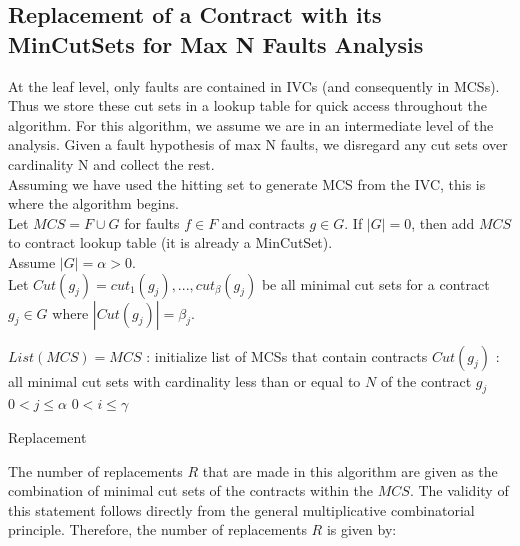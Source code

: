 \subsection{Replacement of a Contract with its MinCutSets for Max N Faults Analysis}

At the leaf level, only faults are contained in IVCs (and consequently in MCSs). Thus we store these cut sets in a lookup table for quick access throughout the algorithm. For this algorithm, we assume we are in an intermediate level of the analysis. Given a fault hypothesis of max N faults, we disregard any cut sets over cardinality N and collect the rest.\\

Assuming we have used the hitting set to generate MCS from the IVC, this is where the algorithm begins. \\

Let $MCS = F \cup G$ for faults $f \in F$ and contracts $g \in G$. If $|G| = 0$, then add $MCS$ to contract lookup table (it is already a MinCutSet). \\

Assume $|G| = \alpha > 0$.\\

Let $Cut(g_j) = {cut_1(g_j), ..., cut_{\beta}(g_j)}$ be all minimal cut sets for a contract $g_j \in G$ where $|Cut(g_j)|=\beta_j$.\\

\begin{algorithm}[H]
	$List(MCS) = {MCS}$ : initialize list of MCSs that contain contracts \;
	$Cut(g_j)$ : all minimal cut sets with cardinality less than or equal to $N$ of the contract $g_j$ \;
	$0 < j \leq \alpha$ \;
	$0 < i \leq \gamma$ \;
	\caption{Replacement}
	\label{alg:repl_alg}
\end{algorithm}

The number of replacements $R$ that are made in this algorithm are given as the combination of minimal cut sets of the contracts within the $MCS$. The validity of this statement follows directly from the general multiplicative combinatorial principle. Therefore, the number of replacements $R$ is given by:\\

